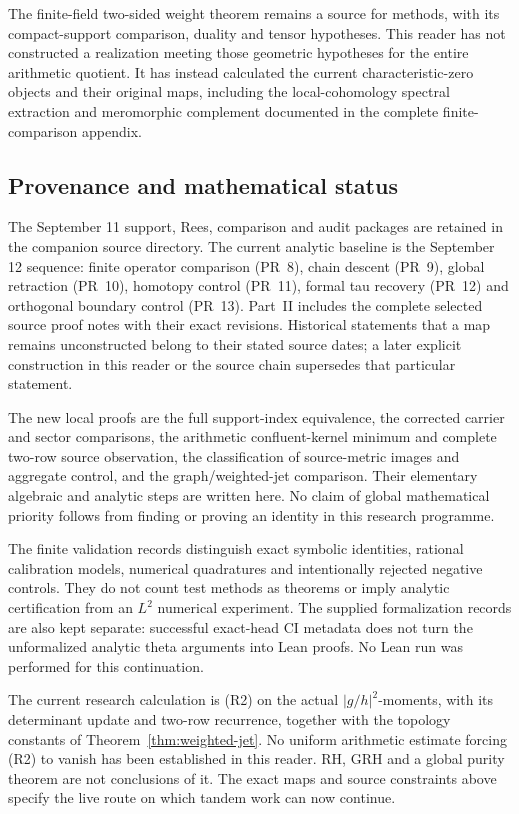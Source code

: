 The finite-field two-sided weight theorem remains a source for
methods, with its compact-support comparison, duality and
tensor hypotheses. This reader has not constructed a realization
meeting those geometric hypotheses for the entire arithmetic
quotient. It has instead calculated the current characteristic-zero
objects and their original maps, including the local-cohomology
spectral extraction and meromorphic complement documented in
the complete finite-comparison appendix.

\subsection{Provenance and mathematical status}
The September 11 support, Rees, comparison and audit packages
are retained in the companion source directory. The current
analytic baseline is the September 12 sequence: finite operator
comparison (PR~8), chain descent (PR~9), global retraction
(PR~10), homotopy control (PR~11), formal tau recovery (PR~12)
and orthogonal boundary control (PR~13).
Part~II includes the complete selected source proof notes with
their exact revisions. Historical statements that a map remains
unconstructed belong to their stated source dates; a later
explicit construction in this reader or the source chain
supersedes that particular statement.

The new local proofs are the full support-index equivalence,
the corrected carrier and sector comparisons, the arithmetic
confluent-kernel minimum and complete two-row source observation,
the classification of source-metric images and aggregate control,
and the graph/weighted-jet comparison.
Their elementary algebraic and analytic steps are written here.
No claim of global mathematical priority follows from finding
or proving an identity in this research programme.

The finite validation records distinguish exact symbolic
identities, rational calibration models, numerical quadratures
and intentionally rejected negative controls. They do not count
test methods as theorems or imply analytic certification from
an \(L^2\) numerical experiment. The supplied formalization records
are also kept separate: successful exact-head CI metadata
does not turn the unformalized analytic theta arguments into
Lean proofs. No Lean run was performed for this continuation.

The current research calculation is (R2) on the actual
\(|g/h|^2\)-moments, with its determinant update and two-row
recurrence, together with the topology constants of
Theorem~\ref{thm:weighted-jet}. No uniform arithmetic estimate
forcing (R2) to vanish has been established in this reader.
RH, GRH and a global purity theorem are not conclusions of it.
The exact maps and source constraints above specify the live
route on which tandem work can now continue.

